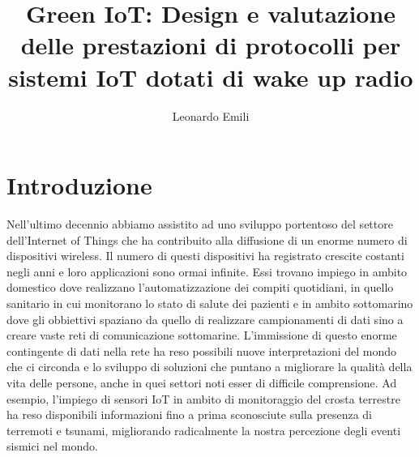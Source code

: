 \documentclass[binding=0.6cm,TFA]{sapthesis}
\title{Green IoT: Design e valutazione delle prestazioni di protocolli per sistemi IoT dotati di wake up radio}
\author{Leonardo Emili}
\begin{document}
\large

\frontmatter
\maketitle

\tableofcontents

\mainmatter
\chapter{Introduzione}

Nell'ultimo decennio abbiamo assistito ad uno sviluppo portentoso del settore dell'Internet of Things che ha contribuito alla diffusione
di un enorme numero di dispositivi wireless. Il numero di questi dispositivi ha registrato crescite costanti negli anni e loro applicazioni sono ormai infinite.
Essi trovano impiego in ambito domestico dove realizzano l'automatizzazione dei compiti quotidiani, in quello sanitario in cui monitorano lo stato di salute
dei pazienti e in ambito sottomarino dove gli obbiettivi spaziano da quello di realizzare campionamenti di dati sino a creare vaste reti di comunicazione sottomarine.
L'immissione di questo enorme contingente di dati nella rete ha reso possibili nuove interpretazioni del mondo che ci circonda e lo sviluppo di soluzioni che puntano
a migliorare la qualità della vita delle persone, anche in quei settori noti esser di difficile comprensione. Ad esempio, l'impiego di sensori IoT in ambito di
monitoraggio del crosta terrestre ha reso disponibili informazioni fino a prima sconosciute sulla presenza di terremoti e tsunami, migliorando radicalmente
la nostra percezione degli eventi sismici nel mondo.\\
\end{document}
